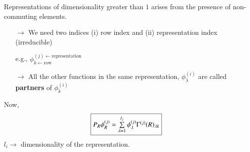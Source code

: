 Representations of dimensionality greater than $1$ arises from the presence of non-commuting elements.
\begin{itemize}
\item[$\to$] We need two indices (i) row index and (ii) representation index (irreducible)

e.g., $\phi^{(j) \leftarrow \text{representation}}_{k\leftarrow \text{row}}$

\item[$\to$] All the other functions in the same representation, $\phi^{(i)}_{\lambda}$ are called {\bf partners} of $\phi^{(i)}_{k}$
\end{itemize}
Now, 
$$
\fbox{$P_{R}\phi^{(j)}_{R}=\sum\limits^{l_{j}}_{\lambda=1}\phi^{(j)}_{\lambda}\Gamma^{(j)}(R)_{\lambda k}$}
$$
$l_{i}\to$ dimensionality of the representation.

